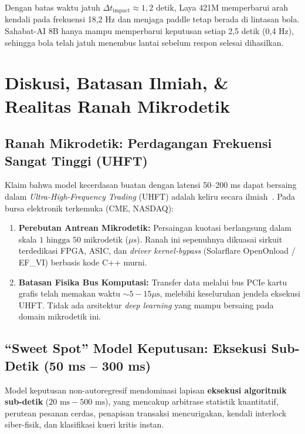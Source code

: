\documentclass[journal,compsoc]{IEEEtran}
\begin{document}
Dengan batas waktu jatuh $\Delta t_{\text{impact}} \approx 1,2 \text{ detik}$, Laya 421M memperbarui arah kendali pada frekuensi 18,2 Hz dan menjaga paddle tetap berada di lintasan bola. Sahabat-AI 8B hanya mampu memperbarui keputusan setiap 2,5 detik (0,4 Hz), sehingga bola telah jatuh menembus lantai sebelum respon selesai dihasilkan.

\section{Diskusi, Batasan Ilmiah, \& Realitas Ranah Mikrodetik}

\subsection{Ranah Mikrodetik: Perdagangan Frekuensi Sangat Tinggi (UHFT)}
Klaim bahwa model kecerdasan buatan dengan latensi 50--200 ms dapat bersaing dalam \textit{Ultra-High-Frequency Trading} (UHFT) adalah keliru secara ilmiah~\cite{budish2015highfrequency}. Pada bursa elektronik terkemuka (CME, NASDAQ):
\begin{enumerate}
    \item \textbf{Perebutan Antrean Mikrodetik:} Persaingan kuotasi berlangsung dalam skala $1 \text{ hingga } 50 \text{ mikrodetik}$ ($\mu\text{s}$). Ranah ini sepenuhnya dikuasai sirkuit terdedikasi FPGA, ASIC, dan \textit{driver kernel-bypass} (Solarflare OpenOnload / EF\_VI) berbasis kode C++ murni.
    \item \textbf{Batasan Fisika Bus Komputasi:} Transfer data melalui bus PCIe kartu grafis telah memakan waktu $\sim 5 - 15 \mu\text{s}$, melebihi keseluruhan jendela eksekusi UHFT. Tidak ada arsitektur \textit{deep learning} yang mampu bersaing pada domain mikrodetik ini.
\end{enumerate}

\subsection{``Sweet Spot'' Model Keputusan: Eksekusi Sub-Detik (50 ms -- 300 ms)}
Model keputusan non-autoregresif mendominasi lapisan \textbf{eksekusi algoritmik sub-detik} ($20 \text{ ms} - 500 \text{ ms}$), yang mencakup arbitrase statistik kuantitatif, perutean pesanan cerdas, penapisan transaksi mencurigakan, kendali interlock siber-fisik, dan klasifikasi kueri kritis instan.
\end{document}
